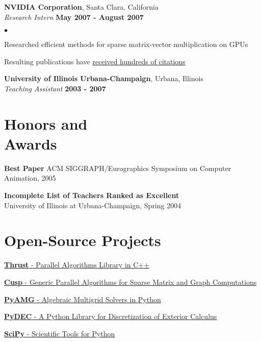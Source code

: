 \documentclass[margin,line]{res}
\newenvironment{list2}{
  \begin{list}{$\bullet$}{%
      \setlength{\itemsep}{0in}
      \setlength{\parsep}{0in} \setlength{\parskip}{0in}
      \setlength{\topsep}{0in} \setlength{\partopsep}{0in}
      \setlength{\leftmargin}{0.2in}}}{\end{list}}
\begin{document}
\begin{resume}
{\bf NVIDIA Corporation}, Santa Clara, California\\
{\em Research Intern} \hfill {\bf May 2007 - August 2007}\\
\vspace{-.3cm}
\begin{list2}
\item Researched efficient methods for sparse matrix-vector multiplication on GPUs
\item Resulting publications have \href{http://scholar.google.com/citations?user=BA-ae2MAAAAJ}{received hundreds of citations}
\end{list2}

{\bf University of Illinois Urbana-Champaign}, Urbana, Illinois\\
{\em Teaching Assistant} \hfill {\bf 2003 - 2007}\\

\section{\sc Honors and \\ Awards}
{\bf Best Paper}
ACM SIGGRAPH/Eurographics Symposium on Computer Animation, 2005

{\bf Incomplete List of Teachers Ranked as Excellent} \\
University of Illinois at Urbana-Champaign, Spring 2004


\section{\sc Open-Source Projects}
\href{http://thrust.googlecode.com}{{\bf Thrust} - Parallel Algorithms Library in C++}

\vspace{-.15cm}
\href{http://cusp-library.googlecode.com}{{\bf Cusp} - Generic Parallel Algorithms for Sparse Matrix and Graph Computations}

\vspace{-.15cm}
\href{http://pyamg.googlecode.com}{{\bf PyAMG} - Algebraic Multigrid Solvers in Python}

\vspace{-.15cm}
\href{http://pydec.googlecode.com}{{\bf PyDEC} - A Python Library for Discretization of Exterior Calculus}

\vspace{-.15cm}
\href{http://www.scipy.org}{{\bf SciPy} - Scientific Tools for Python} \\



\end{resume}
\end{document}
